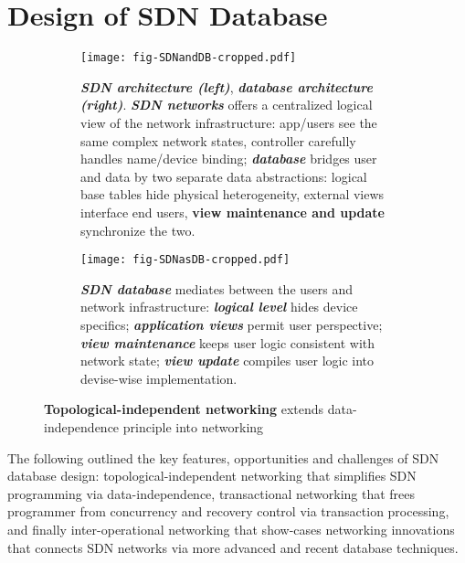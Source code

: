 \section{Design of SDN Database}

\begin{figure*}[ht!]
        \centering
        \begin{subfigure}[t]{.6\linewidth}\centering
          \texttt{[image: fig-SDNandDB-cropped.pdf]}
          \caption{\textit{\textbf{SDN architecture (left)}},
            \textit{\textbf{database architecture
                (right)}}. \textit{\textbf{SDN networks}} offers a
            centralized logical view of the network infrastructure:
            app/users see the same complex network states, controller
            carefully handles name/device binding;
            \textit{\textbf{database}} bridges user and data by two
            separate data abstractions: logical base tables hide
            physical heterogeneity, external views interface end
            users, \textbf{view maintenance and update} synchronize
            the two.}
          \label{fig:SDNandDB}
        \end{subfigure}
        \hfill
        \begin{subfigure}[t]{.39\linewidth}\centering
          \texttt{[image: fig-SDNasDB-cropped.pdf]}
          \caption{\textit{\textbf{SDN database}} mediates between the
            users and network infrastructure: \textbf{\textit{logical
                level}} hides device specifics;
            \textit{\textbf{application views}} permit user
            perspective; \textit{\textbf{view maintenance}} keeps user
            logic consistent with network state; \textit{\textbf{view
                update}} compiles user logic into devise\hyp{}wise
            implementation.}
          \label{fig:SDNasDB}
        \end{subfigure}
        \caption{\textbf{Topological\hyp{}independent networking}
          extends data-independence principle into
          networking}\label{fig:overview}
\end{figure*}

The following outlined the key features, opportunities and challenges
of SDN database design: topological\hyp{}independent networking that
simplifies SDN programming via data\hyp{}independence, transactional
networking that frees programmer from concurrency and recovery control
via transaction processing, and finally inter\hyp{}operational
networking that show\hyp{}cases networking innovations that connects
SDN networks via more advanced and recent database techniques.

